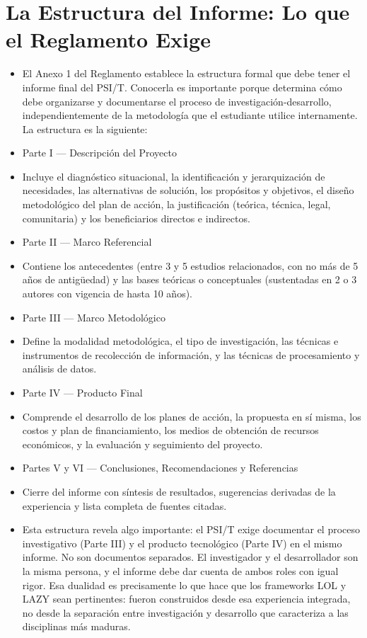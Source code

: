 \documentclass[14pt,a4paper,oneside]{extbook}
\begin{document}
\section{La Estructura del Informe: Lo que el Reglamento Exige}
\begin{itemize}
\item El Anexo 1 del Reglamento establece la estructura formal que debe tener el informe final del PSI/T. Conocerla es importante porque determina cómo debe organizarse y documentarse el proceso de investigación-desarrollo, independientemente de la metodología que el estudiante utilice internamente. La estructura es la siguiente:
\item Parte I --- Descripción del Proyecto
\item Incluye el diagnóstico situacional, la identificación y jerarquización de necesidades, las alternativas de solución, los propósitos y objetivos, el diseño metodológico del plan de acción, la justificación (teórica, técnica, legal, comunitaria) y los beneficiarios directos e indirectos.
\item Parte II --- Marco Referencial
\item Contiene los antecedentes (entre 3 y 5 estudios relacionados, con no más de 5 años de antigüedad) y las bases teóricas o conceptuales (sustentadas en 2 o 3 autores con vigencia de hasta 10 años).
\item Parte III --- Marco Metodológico
\item Define la modalidad metodológica, el tipo de investigación, las técnicas e instrumentos de recolección de información, y las técnicas de procesamiento y análisis de datos.
\item Parte IV --- Producto Final
\item Comprende el desarrollo de los planes de acción, la propuesta en sí misma, los costos y plan de financiamiento, los medios de obtención de recursos económicos, y la evaluación y seguimiento del proyecto.
\item Partes V y VI --- Conclusiones, Recomendaciones y Referencias
\item Cierre del informe con síntesis de resultados, sugerencias derivadas de la experiencia y lista completa de fuentes citadas.
\item Esta estructura revela algo importante: el PSI/T exige documentar el proceso investigativo (Parte III) y el producto tecnológico (Parte IV) en el mismo informe. No son documentos separados. El investigador y el desarrollador son la misma persona, y el informe debe dar cuenta de ambos roles con igual rigor. Esa dualidad es precisamente lo que hace que los frameworks LOL y LAZY sean pertinentes: fueron construidos desde esa experiencia integrada, no desde la separación entre investigación y desarrollo que caracteriza a las disciplinas más maduras.
\end{itemize}
\end{document}
